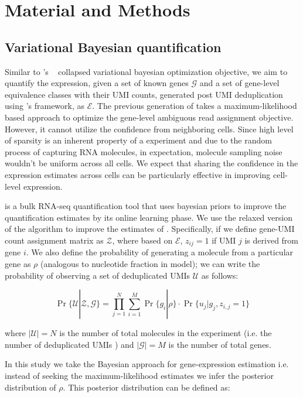\section{Material and Methods}
\label{sec:alv2_methods}

\subsection{Variational Bayesian \dscrnaseq quantification}
Similar to \salmon 's ~\citep{salmon} collapsed variational bayesian optimization 
objective, we aim to quantify the expression, given a set of known genes $\mathcal{G}$ and a set
of gene-level equivalence classes with their UMI counts, generated post UMI deduplication using \alevin 's 
framework, as $\mathcal{E}$. The previous generation of \alevin takes a maximum-likelihood based approach to 
optimize the gene-level ambiguous read assignment objective. However, it cannot utilize the 
confidence from neighboring cells. Since high level of sparsity is an inherent property of a \dscrnaseq
experiment and due to the random process of capturing RNA molecules, in expectation, molecule 
sampling noise wouldn't be uniform across all cells. We expect that sharing the confidence in 
the expression estimates across cells can be particularly effective in improving cell-level expression. 

\salmon is a bulk RNA-seq quantification tool that uses bayesian priors to improve the 
quantification estimates by its online learning phase. We use the relaxed version of the algorithm 
to improve the estimates of \alevin. Specifically, if we define gene-UMI count 
assignment matrix as $\mathcal{Z}$, where based on $\mathcal{E}$, $z_{ij}=1$ if UMI $j$ is derived from 
gene $i$. We also define the probability of generating a molecule from a particular gene as $\rho$ (analogous to 
nucleotide fraction in \salmon model); we can write the probability of observing a set of deduplicated 
UMIs $\mathcal{U}$ as follows:

\begin{equation}
    \Pr\{\mathcal{U} | \mathcal{Z},\mathcal{G}\} = 
    \prod_{j=1}^{N}\sum_{i=1}^{M}\Pr\{ g_i | \rho \} \cdot \Pr\{ u_j | g_j, z_{i,j} = 1 \}
\end{equation}
 
 where $|\mathcal{U}| = N$ is the number of total molecules in the experiment (i.e. the number of 
 deduplicated UMIs ) and $|\mathcal{G}| = M$ is the number of total genes.
 
In this study we take the Bayesian approach for gene-expression estimation i.e. instead of 
seeking the maximum-likelihood estimates we infer the posterior distribution of $\rho$. 
This posterior distribution can be defined as:

